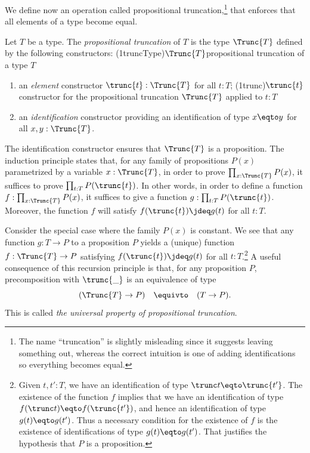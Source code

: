 We define now an operation called propositional truncation,\footnote{%
The name ``truncation'' is slightly misleading since it suggests leaving
something out, whereas the correct intuition is one of adding identifications
so everything becomes equal.}
that enforces that all elements of a type become equal.

\begin{definition}\label{def:prop-trunc}
Let $T$ be a type. The \emph{propositional truncation} of $T$
is the type  $\Trunc{T}$ defined by the following constructors:%
%
%
\glossary(1truncType){$\protect\Trunc{T}$}{propositional truncation of a type $T$}
\begin{enumerate}
\item an \emph{element} constructor $\trunc{t} : \Trunc{T}$ for all $t:T$;%
  \glossary(1trunc){$\protect\trunc{t}$}{constructor for the propositional truncation $\Trunc{T}$ applied to $t:T$}
\item an \emph{identification} constructor providing an identification of type $x \eqto y$  for all $x,y:\Trunc{T}$.
\end{enumerate}
The identification constructor ensures that $\Trunc{T}$ is a
proposition. The induction principle states that,
for any family of propositions $P(x)$ parametrized by a variable $x:\Trunc{T}$,
in order to prove $\prod_{x:\Trunc{T}} P(x)$,
it suffices to prove $\prod_{t:T} P(\trunc{t})$. In other
words, in order to define a function $f:\prod_{x:\Trunc{T}} P(x)$,
it suffices to give a function $g: \prod_{t:T} P(\trunc{t})$.
Moreover, the function $f$ will satisfy $f(\trunc{t})\jdeq g(t)$ for all $t:T$.
\end{definition}

Consider the special case where the family $P(x)$ is constant.
We see that any function $g: T\to P$ to a proposition $P$ yields a (unique) function $f:\Trunc{T}\to P$
satisfying $f(\trunc{t})\jdeq g(t)$ for all $t:T$.\footnote{%
Given $t, t' : T$, we have an identification of type $ \trunc t \eqto \trunc {t'} $.
The existence of the function $f$ implies that we have an identification of type $ f(\trunc t) \eqto f(\trunc {t'}) $,
and hence an identification of type $g(t) \eqto g(t')$.  Thus a necessary condition for the existence of $f$ is
the existence of identifications of type $g(t) \eqto g(t')$.  That justifies
the hypothesis that $P$ is a proposition.}
A useful consequence of this recursion principle is that,
for any proposition $P$, precomposition with $\trunc{\_}$ is an equivalence of type
\[
(\Trunc{T} \to P) \quad \equivto \quad (T \to P).
\]
This is called \emph{the universal property of propositional truncation}.

